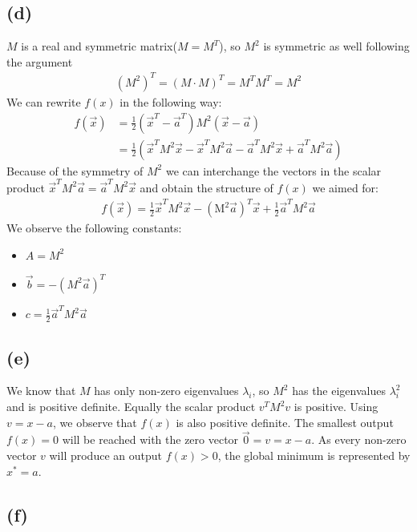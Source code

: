 \documentclass{article}
\begin{document}
    \subsection*{(d)}
$M$ is a real and symmetric matrix($M = M^T$), so $M^2$ is symmetric as well following the argument
\begin{align}
    (M^2)^T = (M \cdot M)^T = M^T M^T = M^2
\end{align}
We can rewrite $f(x)$ in the following way:
\begin{align*}
f(\vec{x}) &= \frac{1}{2} \left( \vec{x}^T - \vec{a}^T \right) M^2 (\vec{x} - \vec{a}) \\
&= \frac{1}{2} \left( \vec{x}^T M^2 \vec{x} - \vec{x}^T M^2 \vec{a} - \vec{a}^T M^2 \vec{x} + \vec{a}^T M^2 \vec{a} \right)
\end{align*}
Because of the symmetry of $M^2$ we can interchange the vectors in the scalar product $\vec{x}^T M^2 \vec{a} = \vec{a}^T M^2 \vec{x}$ and obtain the structure of $f(x)$ we aimed for:
\begin{align}
    f(\vec{x}) = \frac{1}{2} \vec{x}^T M^2 \vec{x} - (\text{M}^2 \vec{a})^T \vec{x} + \frac{1}{2} \vec{a}^T M^2 \vec{a}
\end{align}
We observe the following constants:
\begin{itemize}
    \item $A = M^2$
    \item $\vec{b} = -(M^2 \vec{a})^T$
    \item $c = \frac{1}{2} \vec{a}^T M^2 \vec{a}$
\end{itemize}

\subsection*{(e)}
We know that $M$ has only non-zero eigenvalues $\lambda_i$, so $M^2$ has the eigenvalues $\lambda_i^2$ and is positive definite. Equally the scalar product $v^T M^2 v$ is positive.
Using $v=x-a$, we observe that $f(x)$ is also positive definite. The smallest output $f(x)=0$ will be reached with the zero vector $\vec{0} = v=x-a$. As every non-zero vector $v$ will produce an output $f(x)>0$, the global minimum is represented by $x^*=a$.

\subsection*{(f)}
\end{document}
